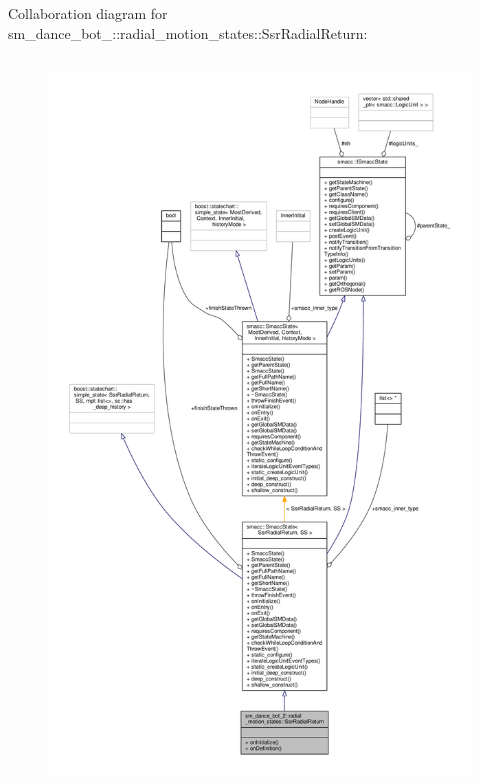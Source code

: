 Collaboration diagram for sm\+\_\+dance\+\_\+bot\+\_\+:\+:radial\+\_\+motion\+\_\+states\+:\+:Ssr\+Radial\+Return\+:\nopagebreak
\begin{figure}[H]
\begin{center}
\leavevmode
\includegraphics[height=550pt]{structsm__dance__bot__2_1_1radial__motion__states_1_1SsrRadialReturn__coll__graph}
\end{center}
\end{figure}
